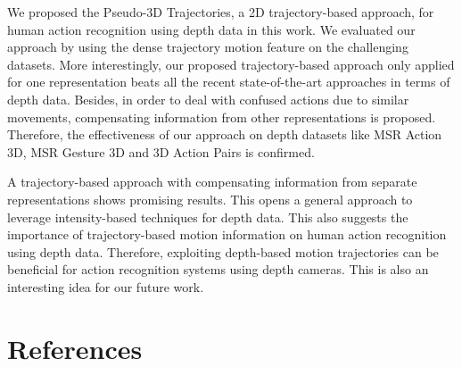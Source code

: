 \documentclass[final,3p,times,twocolumn]{elsarticle}
\begin{document}
We proposed the Pseudo-3D Trajectories, a 2D trajectory-based approach, for human action recognition using depth data in this work. We evaluated our approach by using the dense trajectory motion feature on the challenging datasets. More interestingly, our proposed trajectory-based approach only applied for one representation beats all the recent state-of-the-art approaches in terms of depth data. Besides, in order to deal with confused actions due to similar movements, compensating information from other representations is proposed. Therefore, the effectiveness of our approach on depth datasets like MSR Action 3D, MSR Gesture 3D and 3D Action Pairs is confirmed.

A trajectory-based approach with compensating information from separate representations shows promising results. This opens a general approach to leverage intensity-based techniques for depth data. This also suggests the importance of trajectory-based motion information on human action recognition using depth data. Therefore, exploiting depth-based motion trajectories can be beneficial for action recognition systems using depth cameras. This is also an interesting idea for our future work.

\section*{References}



\end{document}
